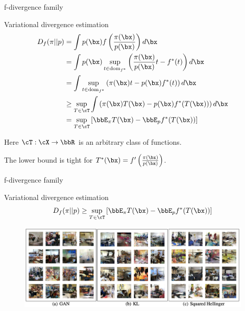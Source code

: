 \begin{frame}{f-divergence family}
	\begin{block}{Variational divergence estimation}
		\vspace{-0.6cm}
		\begin{align*}
			D_f(\pi || p) &= \int p(\bx) f\left( \frac{\pi(\bx)}{p(\bx)} \right) d \bx \\
			& = \int p(\bx) \sup_{t \in \text{dom}_{f^*}} \left( \frac{\pi(\bx)}{p(\bx)} t - f^*(t) \right) d \bx \\
			& = \int \sup_{t \in \text{dom}_{f^*}} \left( \pi(\bx)t - p(\bx) f^*(t) \right) d \bx \\
			& \geq \sup_{T \in \cT} \int \left( \pi(\bx)T(\bx) - p(\bx) f^*(T(\bx)) \right) d \bx \\
			& = \sup_{T \in \cT} \left[\bbE_{\pi}T(\bx) -  \bbE_p f^*(T(\bx)) \right]
		\end{align*}
	\vspace{-0.6cm}
	\end{block}
	Here $\cT: \cX \rightarrow \bbR$ is an arbitrary class of functions.
	
	The lower bound is tight for $T^*(\bx) = f'\left( \frac{\pi(\bx)}{p(\bx)} \right)$.
\end{frame}
\begin{frame}{f-divergence family}
	\begin{block}{Variational divergence estimation}
		\[
			D_f(\pi || p) \geq \sup_{T \in \cT} \left[\bbE_{\pi}T(\bx) -  \bbE_p f^*(T(\bx)) \right]
		\]
	\end{block}
	\begin{figure}
		\centering
		\includegraphics[width=1.0\linewidth]{figs/f_div_results}
	\end{figure}

\end{frame}
